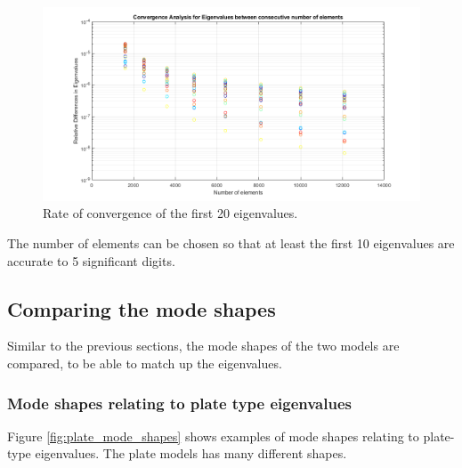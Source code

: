 \documentclass[../../main.tex]{subfiles}
\begin{document}
\begin{figure}[H]
    \centering
    \begin{adjustbox}{center}
        \includegraphics[scale=0.4]{Plate accuracy_no_legend.png}
    \end{adjustbox}
    \caption{Rate of convergence of the first 20 eigenvalues.}
    \label{fig:conv_3d_eig}
\end{figure}

The number of elements can be chosen so that at least the first 10 eigenvalues are accurate to 5 significant digits.

\subsection{Comparing the mode shapes}
Similar to the previous sections, the mode shapes of the two models are compared, to be able to match up the eigenvalues.

\subsubsection{Mode shapes relating to plate type eigenvalues}
Figure \ref{fig:plate_mode_shapes} shows examples of mode shapes relating to plate-type eigenvalues. The plate models has many different shapes.
\end{document}
